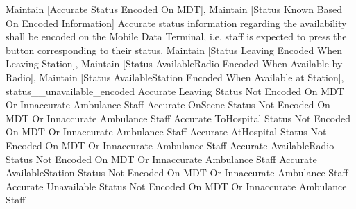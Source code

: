 	 {Maintain [Accurate Status Encoded On MDT], Maintain [Status Known Based On Encoded Information]}
\stopkaosspec
\startkaosspec
	 {Accurate status information regarding the availability shall be encoded on the Mobile Data Terminal, i.e. staff is expected to press the button corresponding to their status.}
	 {Maintain [Status Leaving Encoded When Leaving Station], Maintain [Status AvailableRadio Encoded When Available by Radio], Maintain [Status AvailableStation Encoded When Available at Station], status__unavailable_encoded}
\stopkaosspec
\startkaosspec
	 {}
	 {Accurate Leaving Status Not Encoded On MDT Or Innaccurate}
	 {Ambulance Staff}
\stopkaosspec
\startkaosspec
	 {}
	 {Accurate OnScene Status Not Encoded On MDT Or Innaccurate}
	 {Ambulance Staff}
\stopkaosspec
\startkaosspec
	 {}
	 {Accurate ToHospital Status Not Encoded On MDT Or Innaccurate}
	 {Ambulance Staff}
\stopkaosspec
\startkaosspec
	 {}
	 {Accurate AtHospital Status Not Encoded On MDT Or Innaccurate}
	 {Ambulance Staff}
\stopkaosspec
\startkaosspec
	 {}
	 {Accurate AvailableRadio Status Not Encoded On MDT Or Innaccurate}
	 {Ambulance Staff}
\stopkaosspec
\startkaosspec
	 {}
	 {Accurate AvailableStation Status Not Encoded On MDT Or Innaccurate}
	 {Ambulance Staff}
\stopkaosspec
\startkaosspec
	 {}
	 {Accurate Unavailable Status Not Encoded On MDT Or Innaccurate}
	 {Ambulance Staff}
\stopkaosspec
\startkaosspec
